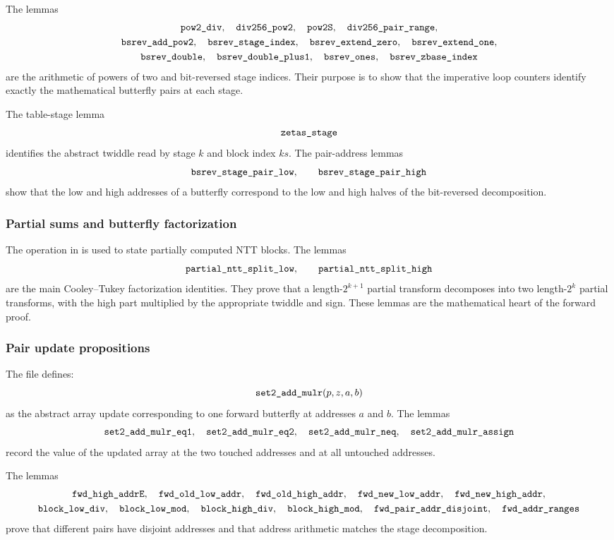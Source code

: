 \documentclass[11pt]{article}
\newcommand{\ec}[1]{\texttt{\detokenize{#1}}}
\begin{document}
The lemmas
\[
\begin{gathered}
  \ec{pow2_div},\quad
  \ec{div256_pow2},\quad
  \ec{pow2S},\quad
  \ec{div256_pair_range},\\
  \ec{bsrev_add_pow2},\quad
  \ec{bsrev_stage_index},\quad
  \ec{bsrev_extend_zero},\quad
  \ec{bsrev_extend_one},\\
  \ec{bsrev_double},\quad
  \ec{bsrev_double_plus1},\quad
  \ec{bsrev_ones},\quad
  \ec{bsrev_zbase_index}
\end{gathered}
\]
are the arithmetic of powers of two and bit-reversed stage indices.  Their
purpose is to show that the imperative loop counters identify exactly the
mathematical butterfly pairs at each stage.

The table-stage lemma
\[
  \ec{zetas_stage}
\]
identifies the abstract twiddle read by stage \(k\) and block index \(ks\).
The pair-address lemmas
\[
  \ec{bsrev_stage_pair_low},\qquad
  \ec{bsrev_stage_pair_high}
\]
show that the low and high addresses of a butterfly correspond to the low and
high halves of the bit-reversed decomposition.

\subsubsection{Partial sums and butterfly factorization}

The operation \ec{partial_ntt} in \ec{NTTFullSpec.ec} is used to state
partially computed NTT blocks.  The lemmas
\[
  \ec{partial_ntt_split_low},
  \qquad
  \ec{partial_ntt_split_high}
\]
are the main Cooley--Tukey factorization identities.  They prove that a
length-\(2^{k+1}\) partial transform decomposes into two length-\(2^k\)
partial transforms, with the high part multiplied by the appropriate twiddle
and sign.  These lemmas are the mathematical heart of the forward proof.

\subsubsection{Pair update propositions}

The file defines:
\[
  \ec{set2_add_mulr}(p,z,a,b)
\]
as the abstract array update corresponding to one forward butterfly at
addresses \(a\) and \(b\).  The lemmas
\[
  \ec{set2_add_mulr_eq1},\quad
  \ec{set2_add_mulr_eq2},\quad
  \ec{set2_add_mulr_neq},\quad
  \ec{set2_add_mulr_assign}
\]
record the value of the updated array at the two touched addresses and at all
untouched addresses.

The lemmas
\[
\begin{gathered}
  \ec{fwd_high_addrE},\quad
  \ec{fwd_old_low_addr},\quad
  \ec{fwd_old_high_addr},\quad
  \ec{fwd_new_low_addr},\quad
  \ec{fwd_new_high_addr},\\
  \ec{block_low_div},\quad
  \ec{block_low_mod},\quad
  \ec{block_high_div},\quad
  \ec{block_high_mod},\quad
  \ec{fwd_pair_addr_disjoint},\quad
  \ec{fwd_addr_ranges}
\end{gathered}
\]
prove that different pairs have disjoint addresses and that address arithmetic
matches the stage decomposition.
\end{document}
